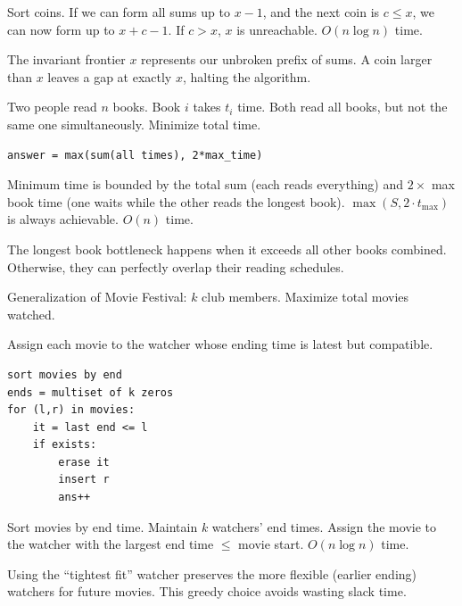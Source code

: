 \Solution Sort coins. If we can form all sums up to $x-1$, and the next coin is $c \le x$, we can now form up to $x+c-1$. If $c > x$, $x$ is unreachable. $O(n \log n)$ time.

\Analysis The invariant frontier $x$ represents our unbroken prefix of sums. A coin larger than $x$ leaves a gap at exactly $x$, halting the algorithm.


\Problem Two people read $n$ books. Book $i$ takes $t_i$ time. Both read all books, but not the same one simultaneously. Minimize total time.

\begin{lstlisting}
answer = max(sum(all times), 2*max_time)
\end{lstlisting}

\Solution Minimum time is bounded by the total sum (each reads everything) and $2 \times$ max book time (one waits while the other reads the longest book). $\max(S, 2 \cdot t_{\max})$ is always achievable. $O(n)$ time.

\Analysis The longest book bottleneck happens when it exceeds all other books combined. Otherwise, they can perfectly overlap their reading schedules.


\Problem Generalization of Movie Festival: $k$ club members. Maximize total movies watched.

Assign each movie to the watcher whose ending time is latest but compatible.
\begin{lstlisting}
sort movies by end
ends = multiset of k zeros
for (l,r) in movies:
    it = last end <= l
    if exists:
        erase it
        insert r
        ans++
\end{lstlisting}

\Solution Sort movies by end time. Maintain $k$ watchers' end times. Assign the movie to the watcher with the largest end time $\le$ movie start. $O(n \log n)$ time.

\Analysis Using the ``tightest fit'' watcher preserves the more flexible (earlier ending) watchers for future movies. This greedy choice avoids wasting slack time.
